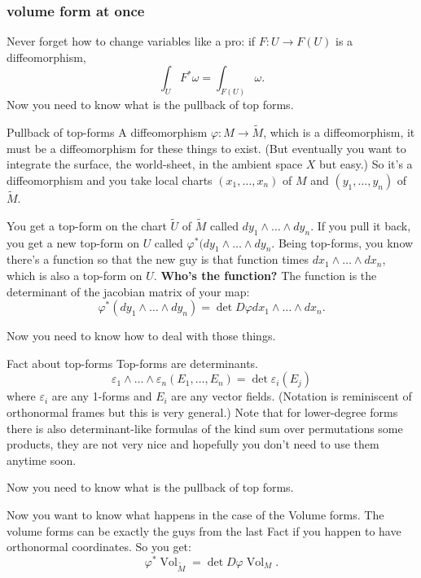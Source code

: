 \subsubsection{volume form at once}

Never forget how to change variables like a pro: if \(F:U \to F(U)\) is a diffeomorphism,
\[\int_U F^*\omega=\int_{F(U)}\omega.\]
Now you need to know what is the pullback of top forms. 

\begin{thing7}{Pullback of top-forms}\leavevmode
A diffeomorphism \(\varphi:M \to \widetilde M\), which is a diffeomorphism, it must be a diffeomorphism for these things to exist. (But eventually you want to integrate the surface, the world-sheet, in the ambient space \(X\) but easy.) So it's a diffeomorphism and you take local charts \((x_1,\ldots,x_n)\) of \(M\) and \((y_1,\ldots,y_n)\) of \(\widetilde{M}\).

You get a top-form on the chart \(\widetilde{U}\) of \(\widetilde{M}\) called \(dy_1\wedge\ldots \wedge dy_n\). If you pull it back, you get a new top-form on \(U\) called \(\varphi^*(dy_1\wedge\ldots \wedge dy_n\). Being top-forms, you know there's a function so that the new guy is that function times \(dx_1\wedge\ldots\wedge dx_n\), which is also a top-form on \(U\). \textbf{Who's the function?} The function is the determinant of the jacobian matrix of your map:
\[\varphi^*(dy_1\wedge\ldots\wedge dy_n)=\det D\varphi dx_1\wedge\ldots\wedge dx_n.\]
\end{thing7}

Now you need to know how to deal with those things.
\begin{thing7}{Fact about top-forms}\leavevmode
Top-forms are determinants.
\[\varepsilon_1 \wedge \ldots \wedge \varepsilon_n(E_1,\ldots,E_n)=\det \varepsilon_i(E_j)\]
where \(\varepsilon_i\) are any 1-forms and \(E_i\) are any vector fields. (Notation is reminiscent of orthonormal frames but this is very general.) Note that for lower-degree forms there is also determinant-like formulas of the kind sum over permutations some products, they are not very nice and hopefully you don't need to use them anytime soon.
\end{thing7}

Now you need to know what is the pullback of top forms. 

Now you want to know what happens in the case of the Volume forms. The volume forms can be exactly the guys from the last Fact if you happen to have orthonormal coordinates. So you get:
\[\varphi^*\operatorname{Vol}_{\widetilde{M}}=\det D\varphi \operatorname{Vol}_M.\]

